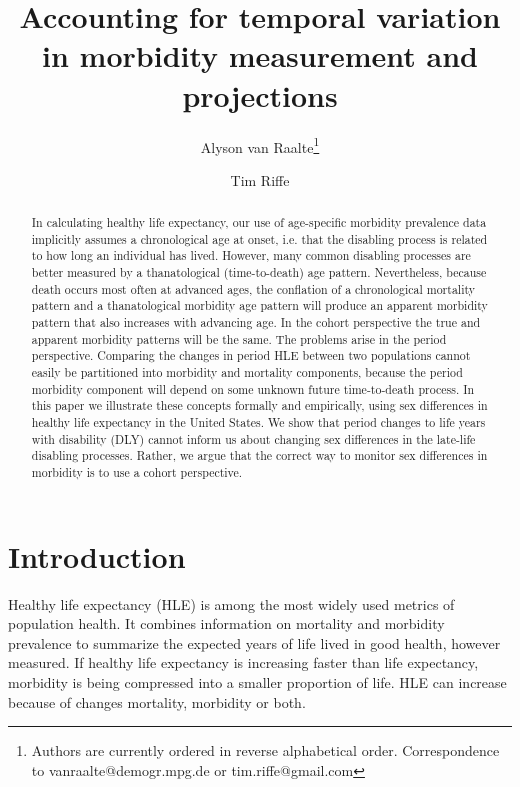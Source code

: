\documentclass[11pt,oneside,a4paper]{article} %
\begin{document}
\title{Accounting for temporal variation in morbidity measurement
and projections}

\author[1]{Alyson van Raalte\thanks{Authors are currently ordered in reverse alphabetical order. Correspondence to vanraalte@demogr.mpg.de or tim.riffe@gmail.com}}
\author[1]{Tim Riffe}


\maketitle

\begin{abstract}
In calculating healthy life expectancy, our use of age-specific morbidity prevalence data implicitly assumes a chronological age at onset, i.e. that the disabling process is related to how long an individual has lived. However, many common disabling processes are better measured by a thanatological (time-to-death) age pattern. Nevertheless, because death occurs most often at advanced ages, the conflation of a chronological mortality pattern and a thanatological morbidity age pattern will produce an apparent morbidity pattern that also increases with advancing age. In the cohort perspective the true and apparent morbidity patterns will be the same. The problems arise in the period perspective. Comparing the changes in period HLE between two populations cannot easily be partitioned into morbidity and mortality components, because the period morbidity component will depend on some unknown future time-to-death process. In this paper we illustrate these concepts formally and empirically, using sex differences in healthy life expectancy in the United States. We show that period changes to life years with disability (DLY) cannot inform us about changing sex differences in the late-life disabling processes. Rather, we argue that the correct way to monitor sex differences in morbidity is to use a cohort perspective.
\end{abstract}

\newpage
\section{Introduction}

Healthy life expectancy (HLE) is among the most widely used metrics of population health. It combines information on mortality and morbidity prevalence to summarize the expected years of life lived in good health, however measured. If healthy life expectancy is increasing faster than life expectancy, morbidity is being compressed into a smaller proportion of life. HLE can increase because of changes mortality, morbidity or both. 
\end{document}
